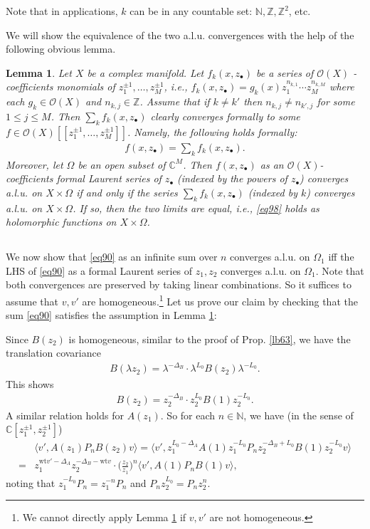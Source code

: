 \documentclass[11pt,b5paper,notitlepage]{article}
\theoremstyle{definition}
\theoremstyle{plain}
\newtheorem{lm}[df]{Lemma}
\newcommand{\bk}[1]{\langle {#1}\rangle}
\newcommand{\bigbk}[1]{\big\langle {#1}\big\rangle}
\newcommand{\scr}{\mathscr}
\newcommand{\blt}{\bullet}
\newcommand{\Cbb}{\mathbb C}
\newcommand{\Nbb}{\mathbb N}
\newcommand{\Zbb}{\mathbb Z}
\newcommand{\wt}{\mathrm{wt}}
\numberwithin{equation}{section}
\begin{document}
Note that in applications, $k$ can be in any countable set: $\Nbb,\Zbb,\Zbb^2$, etc.

We will show the equivalence of the two a.l.u. convergences with the help of the following obvious lemma.

\begin{lm}\label{lb65}
Let $X$ be a complex manifold. Let $f_k(x,z_\blt)$ be a series of $\scr O(X)$ -coefficients monomials of $z_1^{\pm1},\dots,z_M^{\pm1}$, i.e.,   $f_k(x,z_\blt)=g_k(x)z_1^{n_{k,1}}\cdots z_M^{n_{k,M}}$ where each $g_k\in\scr O(X)$ and $n_{k,j}\in\Zbb$. Assume that if $k\neq k'$ then $n_{k,j}\neq n_{k',j}$ for some $1\leq j\leq M$. Then $\sum_k f_k(x,z_\blt)$ clearly converges formally to some $f\in\scr O(X)[[z_1^{\pm1},\dots,z_M^{\pm1}]]$.  Namely, the following holds formally:
\begin{align}
f(x,z_\blt)=\sum_k f_k(x,z_\blt).\label{eq98}
\end{align}
Moreover, let $\Omega$ be an open subset of $\Cbb^M$. Then $f(x,z_\blt)$ as an $\scr O(X)$-coefficients formal Laurent series of $z_\blt$ (indexed by the powers of $z_\blt$) converges a.l.u. on $X\times\Omega$ if and only if the series $\sum_k f_k(x,z_\blt)$ (indexed by $k$) converges a.l.u. on $X\times\Omega$. If so, then the two limits are equal, i.e., \eqref{eq98} holds as holomorphic functions on $X\times\Omega$.
\end{lm}



\subsection{}\label{lb184}

We now show that \eqref{eq90} as an infinite sum over $n$ converges a.l.u. on $\Omega_1$ iff the LHS of \eqref{eq90} as a formal Laurent series of $z_1,z_2$ converges a.l.u. on $\Omega_1$. Note that both convergences are preserved by taking linear combinations. So it suffices to assume that $v,v'$ are homogeneous.\footnote{We cannot directly apply Lemma \ref{lb65} if $v,v'$ are not homogeneous.} Let us prove our claim by checking that  the sum \eqref{eq90} satisfies the assumption in Lemma \ref{lb65}:

Since $B(z_2)$ is homogeneous, similar to the proof of Prop. \ref{lb63}, we have the translation covariance
\begin{align}
	B(\lambda z_2)=\lambda^{-\Delta_B}\cdot\lambda^{L_0}B(z_2)\lambda^{-L_0}.\label{eq103}	
\end{align}
This shows
\begin{align}
B(z_2)=z_2^{-\Delta_B}\cdot z_2^{L_0}B(1)z_2^{-L_0}.\label{eq117}	
\end{align}
A similar relation holds for $A(z_1)$. So for each $n\in\Nbb$, we have (in the sense of  $\Cbb[z_1^{\pm1},z_2^{\pm1}]$)
\begin{align}
	&\bk{v',A(z_1)P_nB(z_2)v}=	\bk{v',z_1^{L_0-\Delta_A}A(1)z_1^{-L_0}P_nz_2^{-\Delta_B+L_0}B(1)z_2^{-L_0}v}\nonumber\\
	=&z_1^{\wt v'-\Delta_A}z_2^{-\Delta_B-\wt v}\cdot \big(\frac{z_2}{z_1}\big)^n\bigbk{v',A(1)P_nB(1)v},\label{eq97}
\end{align}
noting that $z_1^{-L_0}P_n=z_1^{-n}P_n$ and $P_nz_2^{L_0}=P_nz_2^n$. 
\end{document}
